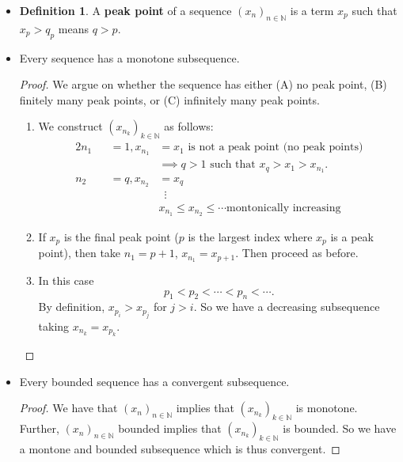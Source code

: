 \documentclass{article}
\newcommand{\N}{\mathbb{N}}
\newcommand{\seq}[2]{(#1_{#2})_{#2 \in \N}}
\newcommand{\?}{\stackrel{?}{=}}
\theoremstyle{definition} %
\newtheorem{definition}[subsection]{Definition} %
\begin{document}
\begin{itemize}
    \item[]
    \begin{definition}
        A \textbf{peak point} of a sequence $\seq{x}{n}$ is a term $x_p$ such that $x_p > q_p$ means $q > p$.
    \end{definition}
    \item[]
    \begin{lemma}
        Every sequence has a monotone subsequence.
    \end{lemma}
    \begin{proof}
        We argue on whether the sequence has either (A) no peak point, (B) finitely many peak points, or (C) infinitely many peak points.
        \begin{enumerate}[label=(\Alph*)]
            \item We construct $(x_{n_k})_{k \in \N}$ as follows:
            \begin{alignat*}{2}
                n_1 &&= 1, x_{n_1} &= x_1 \text{ is not a peak point (no peak points)} \\
                && &\implies q>1 \text{ such that } x_q > x_1 > x_{n_1}. \\
                n_2 &&= q, x_{n_2} &= x_q \\
                && &\hspace{6pt}\vdots \\
                && & x_{n_1} \leq x_{n_2} \leq \cdots \text{montonically increasing}
            \end{alignat*}
            \item If $x_p$ is the final peak point ($p$ is the largest index where $x_p$ is a peak point), then take $n_1 = p + 1$, $x_{n_1} = x_{p + 1}$. Then proceed as before.
            \item In this case
            $$p_1 < p_2 < \cdots < p_n < \cdots.$$
            By definition, $x_{p_i} > x_{p_j}$ for $j > i$. So we have a decreasing subsequence taking $x_{n_k} = x_{p_k}$.
        \end{enumerate}
    \end{proof}
    \item[]
    \begin{theorem}
        Every bounded sequence has a convergent subsequence.
    \end{theorem}
    \begin{proof}
        We have that $\seq{x}{n}$ implies that $(x_{n_k})_{k \in \N}$ is monotone. Further, $\seq{x}{n}$ bounded implies that $(x_{n_k})_{k \in \N}$ is bounded. So we have a montone and bounded subsequence which is thus convergent.

\end{proof}
\end{itemize}
\end{document}
